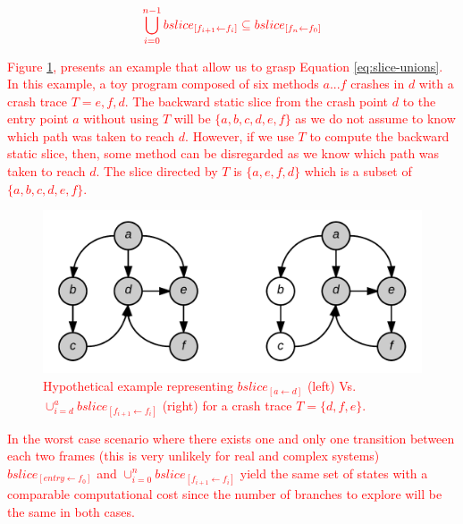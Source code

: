 \documentclass[times, doublespace]{smrauth}
\newcommand{\red}[1]{\textcolor{red}{#1}}
\begin{document}
{\begin{equation}
\centering
\begin{split}
  \red{
\bigcup_{i=0}^{n-1} bslice_{[f_{i+1} \leftarrow f_i]} \subseteq bslice_{[f_n \leftarrow f_0]}
  }
\end{split}
\label{eq:slice-unions}
\end{equation}

\red{Figure \ref{fig:jcharming-slice}, presents an example that allow us to grasp Equation \ref{eq:slice-unions}.
In this example, a toy program composed of six methods $a...f$ crashes in $d$ with a crash trace $T = {e, f, d}$.
The backward static slice from the crash point $d$ to the entry point $a$ without using $T$ will be $\{a, b, c, d, e, f\}$ as we do not assume to know which path was taken to reach $d$.
However, if we use $T$ to compute the backward static slice, then, some method can be disregarded as we know which path was taken to reach $d$.
The slice directed by $T$ is $\{a, e, f, d\}$ which is a subset of $\{a, b, c, d, e, f\}$.}

\begin{figure}
  \centering
    \includegraphics[scale=0.25]{media/jcharming-slices.png}
    \caption{\red{Hypothetical example representing $bslice_{[a \leftarrow d]}$ (left) Vs. $\cup_{i=d}^{a} bslice_{[f_{i+1} \leftarrow f_i]}$ (right) for a crash trace $T=\{d, f, e\}$.
    \label{fig:jcharming-slice}}}
\end{figure}

\red{In the worst case scenario where there exists one and only one
transition between each two frames (this is very unlikely for real
and complex systems) $bslice_{[entry \leftarrow f_0]}$ and
 $\cup_{i=0}^n bslice_{[f_{i+1} \leftarrow f_i]}$ yield the same set of states with a
comparable computational cost since the number of branches
to explore will be the same in both cases.}


}
\end{document}
